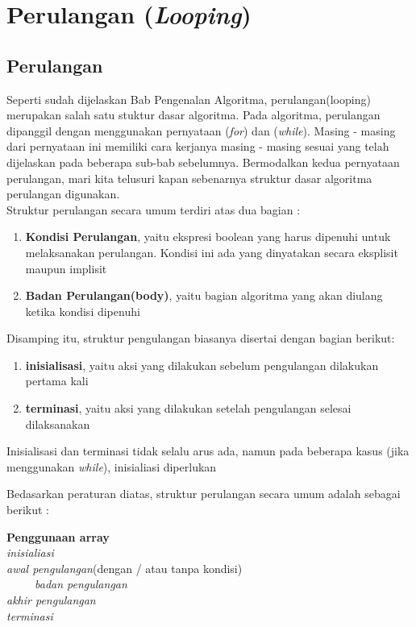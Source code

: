\chapter{Perulangan (\textit{Looping})}

\section{Perulangan}
Seperti sudah dijelaskan Bab Pengenalan Algoritma, perulangan(looping) merupakan salah satu stuktur dasar algoritma. Pada algoritma, perulangan dipanggil dengan menggunakan pernyataan (\textit{for}) dan (\textit{while}). Masing - masing dari pernyataan ini memiliki cara kerjanya masing - masing sesuai yang telah dijelaskan pada beberapa sub-bab sebelumnya. Bermodalkan kedua pernyataan perulangan, mari kita telusuri kapan sebenarnya struktur dasar algoritma perulangan digunakan.  \\

Struktur perulangan secara umum terdiri atas dua bagian : 
\begin{enumerate}
	\item \textbf{Kondisi Perulangan}, yaitu ekspresi boolean yang harus dipenuhi untuk melaksanakan perulangan. Kondisi ini ada yang dinyatakan secara eksplisit maupun implisit
		\item \textbf{Badan Perulangan(body)}, yaitu bagian algoritma yang akan diulang ketika kondisi dipenuhi
\end{enumerate}

Disamping itu, struktur pengulangan biasanya disertai dengan bagian berikut: 
\begin{enumerate}
	\item \textbf{inisialisasi}, yaitu aksi yang dilakukan sebelum pengulangan dilakukan pertama kali 
	\item \textbf{terminasi}, yaitu aksi yang dilakukan setelah pengulangan selesai dilaksanakan
\end{enumerate}
Inisialisasi dan terminasi tidak selalu arus ada, namun pada beberapa kasus (jika menggunakan \textit{while}), inisialiasi diperlukan

Bedasarkan peraturan diatas, struktur perulangan secara umum adalah sebagai berikut : 
\begin{Petunjuk}
\label{Ptk:Struktur Perulangan}
	\textbf{Penggunaan array}\\
		\textit{inisialiasi}\\
		\textit{awal pengulangan}(dengan / atau tanpa kondisi)\\
		~~~~~\textit{badan pengulangan}\\
		\textit{akhir pengulangan}\\
		\textit{terminasi}\\
\end{Petunjuk}

